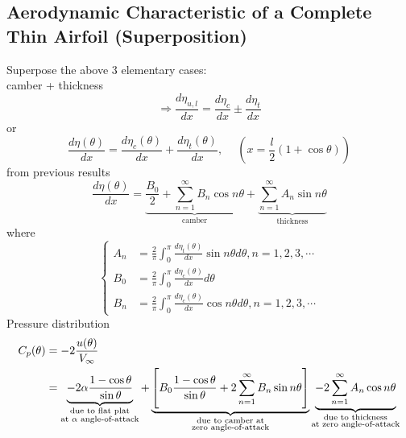 \subsection{Aerodynamic Characteristic of a Complete Thin Airfoil (Superposition)}
Superpose the above 3 elementary cases:\\
camber + thickness
\[
\Longrightarrow\frac{d\eta_{u,l}}{dx} = \frac{d\eta_c}{dx}\pm\frac{d\eta_t}{dx}
\]
or
\begin{equation}
\frac{d\eta(\theta)}{dx} = \frac{d\eta_c(\theta)}{dx} + \frac{d\eta_t(\theta)}{dx}, \phantom{-}\left(x=\frac{l}{2}\left(1+\cos\theta\right)\right)
\label{eq: 6-2-73}
\end{equation}
from previous results
\begin{equation}
\frac{d\eta(\theta)}{dx} = \underbrace{\frac{B_0}{2}+\sum_{n=1}^\infty B_n\cos n\theta}_{\text{camber}} + \underbrace{\sum_{n=1}^\infty A_n\sin n\theta}_{\text{thickness}}
\label{eq: 6-2-74}
\end{equation}
where
\begin{equation}
\left\{
\begin{aligned}
A_n &= \frac{2}{\pi}\int_0^\pi\frac{d\eta_t(\theta)}{dx}\sin n\theta d\theta, n=1,2,3,\cdots \\
B_0 &= \frac{2}{\pi}\int_0^\pi\frac{d\eta_c(\theta)}{dx}d\theta \\
B_n &= \frac{2}{\pi}\int_0^\pi\frac{d\eta_c(\theta)}{dx}\cos n\theta d\theta, n=1,2,3,\cdots
\end{aligned}
\right.
\label{eq: 6-2-75}
\end{equation}
Pressure distribution
\begin{align}
C_p(\theta)
&= - 2\frac{u(\theta)}{V_\infty}\nonumber \\
&= \underbrace{-2\alpha\frac{1-\cos\theta}{\sin\theta}}_{
\begin{subarray}{c}
  \text{due to flat plat}\\
  \text{at $\alpha$ angle-of-attack}
\end{subarray}
}
+
\underbrace{\left[B_0\frac{1-\cos\theta}{\sin\theta} + 2\sum_{n=1}^\infty B_n\sin n\theta\right]}_{
\begin{subarray}{c}
  \text{due to camber at}\\
  \text{zero angle-of-attack}
\end{subarray}
}
\underbrace{-2\sum_{n=1}^\infty A_n\cos n\theta}_{
\begin{subarray}{c}
  \text{due to thickness}\\
  \text{at zero angle-of-attack}
\end{subarray}
}
\label{eq: 6-2-76}
\end{align}
